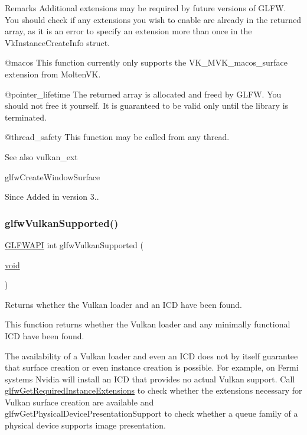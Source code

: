 \begin{DoxyRemark}{Remarks}
Additional extensions may be required by future versions of G\+L\+FW. You should check if any extensions you wish to enable are already in the returned array, as it is an error to specify an extension more than once in the {\ttfamily Vk\+Instance\+Create\+Info} struct.

@macos This function currently only supports the {\ttfamily V\+K\+\_\+\+M\+V\+K\+\_\+macos\+\_\+surface} extension from Molten\+VK.
\end{DoxyRemark}
@pointer\+\_\+lifetime The returned array is allocated and freed by G\+L\+FW. You should not free it yourself. It is guaranteed to be valid only until the library is terminated.

@thread\+\_\+safety This function may be called from any thread.

\begin{DoxySeeAlso}{See also}
vulkan\+\_\+ext 

glfw\+Create\+Window\+Surface
\end{DoxySeeAlso}
\begin{DoxySince}{Since}
Added in version 3.. 
\end{DoxySince}
\mbox{\label{group__vulkan_ga72e7c3757d9ff2333181a5569bb7c403}} 
\subsubsection{\texorpdfstring{glfwVulkanSupported()}{glfwVulkanSupported()}}
{\footnotesize\ttfamily \mbox{\hyperlink{glfw3_8h_a56da5036b2cc259351ae22fd6439bb47}{G\+L\+F\+W\+A\+PI}} int glfw\+Vulkan\+Supported (\begin{DoxyParamCaption}\item[{\mbox{\hyperlink{glad_8h_a950fc91edb4504f62f1c577bf4727c29}{void}}}]{ }\end{DoxyParamCaption})}



Returns whether the Vulkan loader and an I\+CD have been found. 

This function returns whether the Vulkan loader and any minimally functional I\+CD have been found.

The availability of a Vulkan loader and even an I\+CD does not by itself guarantee that surface creation or even instance creation is possible. For example, on Fermi systems Nvidia will install an I\+CD that provides no actual Vulkan support. Call \mbox{\hyperlink{group__vulkan_ga70adaf0cfc99adc484c49ea99e17c2cf}{glfw\+Get\+Required\+Instance\+Extensions}} to check whether the extensions necessary for Vulkan surface creation are available and glfw\+Get\+Physical\+Device\+Presentation\+Support to check whether a queue family of a physical device supports image presentation.

